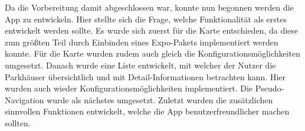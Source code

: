 Da die Vorbereitung damit abgeschlossen war, konnte nun begonnen werden die App zu entwickeln. Hier stellte sich die Frage, welche Funktionalität als erstes entwickelt werden sollte. Es wurde sich zuerst für die Karte entschieden, da diese zum größten Teil durch Einbinden eines Expo-Pakets implementiert werden konnte. Für die Karte wurden zudem auch gleich die Konfigurationsmöglichkeiten umgesetzt. Danach wurde eine Liste entwickelt, mit welcher der Nutzer die Parkhäuser übersichtlich und mit Detail-Informationen betrachten kann. Hier wurden auch wieder Konfigurationsmöglichkeiten implementiert. Die Pseudo-Navigation wurde als nächstes umgesetzt. Zuletzt wurden die zusätzlichen sinnvollen Funktionen entwickelt, welche die App benutzerfreundlicher machen sollten.
%
%
